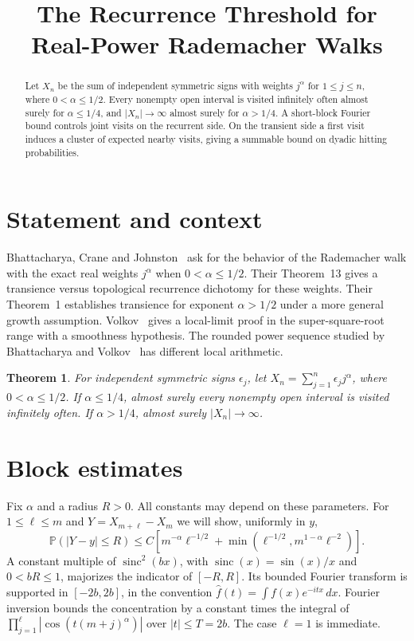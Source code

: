 \documentclass[a4paper,11pt]{amsart}
\date{}
\title{The Recurrence Threshold for Real-Power Rademacher Walks}
\newtheorem{thm}{Theorem}
\DeclareMathOperator{\sinc}{sinc}
\newcommand{\PP}{\mathbb P}
\begin{document}
\begin{abstract}
Let $X_n$ be the sum of independent symmetric signs with weights $j^\alpha$ for $1\le j\le n$, where $0<\alpha\le1/2$. Every nonempty open interval is visited infinitely often almost surely for $\alpha\le1/4$, and $|X_n|\to\infty$ almost surely for $\alpha>1/4$. A short-block Fourier bound controls joint visits on the recurrent side. On the transient side a first visit induces a cluster of expected nearby visits, giving a summable bound on dyadic hitting probabilities.
\end{abstract}
\maketitle
\section{Statement and context}
Bhattacharya, Crane and Johnston~\cite[p.~6]{bcj} ask for the behavior of the Rademacher walk with the exact real weights $j^\alpha$ when $0<\alpha\le1/2$. Their Theorem~13 gives a transience versus topological recurrence dichotomy for these weights. Their Theorem~1 establishes transience for exponent $\alpha>1/2$ under a more general growth assumption. Volkov~\cite{volkov} gives a local-limit proof in the super-square-root range with a smoothness hypothesis. The rounded power sequence studied by Bhattacharya and Volkov~\cite{bv} has different local arithmetic.
\begin{thm}
For independent symmetric signs $\epsilon_j$, let $X_n=\sum_{j=1}^n\epsilon_j j^\alpha$, where $0<\alpha\le1/2$. If $\alpha\le1/4$, almost surely every nonempty open interval is visited infinitely often. If $\alpha>1/4$, almost surely $|X_n|\to\infty$.
\end{thm}

\section{Block estimates}
Fix $\alpha$ and a radius $R>0$. All constants may depend on these parameters. For $1\le\ell\le m$ and $Y=X_{m+\ell}-X_m$ we will show, uniformly in $y$,
\begin{equation}\label{eq:block}
\PP(|Y-y|\le R)\le C\left[m^{-\alpha}\ell^{-1/2}
  +\min(\ell^{-1/2},m^{1-\alpha}\ell^{-2})\right].
\end{equation}
A constant multiple of $\sinc^2(bx)$, with $\sinc(x)=\sin(x)/x$ and $0<bR\le1$, majorizes the indicator of $[-R,R]$. Its bounded Fourier transform is supported in $[-2b,2b]$, in the convention $\widehat f(t)=\int f(x)e^{-itx}\,dx$. Fourier inversion bounds the concentration by a constant times the integral of $\prod_{j=1}^\ell|\cos(t(m+j)^\alpha)|$ over $|t|\le T=2b$. The case $\ell=1$ is immediate.
\end{document}
